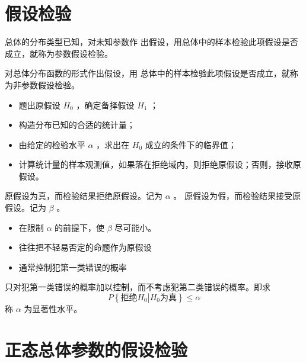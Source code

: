\section{假设检验}

 总体的分布类型已知，对未知参数作 出假设，用总体中的样本检验此项假设是否 成立，就称为参数假设检验。

 对总体分布函数的形式作出假设，用 总体中的样本检验此项假设是否成立，就称 为非参数假设检验。

\begin{itemize}[leftmargin=\paritemindent]
    \item 题出原假设 $ H_0 $ ，确定备择假设 $ H_1 $ ；
    \item 构造分布已知的合适的统计量；
    \item 由给定的检验水平 $ \alpha $ ，求出在 $ H_0 $ 成立的条件下的临界值；
    \item 计算统计量的样本观测值，如果落在拒绝域内，则拒绝原假设；否则，接收原假设。
\end{itemize}

 原假设为真，而检验结果拒绝原假设。记为 $ \alpha $ 。
 原假设为假，而检验结果接受原假设。记为 $ \beta $ 。
\begin{itemize}[leftmargin=\subparitemindent]
    \item 在限制 $ \alpha $ 的前提下，使 $ \beta $ 尽可能小。
    \item 往往把不轻易否定的命题作为原假设
    \item 通常控制犯第一类错误的概率
\end{itemize}

 只对犯第一类错误的概率加以控制，而不考虑犯第二类错误的概率。即求
$$ P\left\{ \mbox{拒绝}H_0 \left| H_0 \mbox{为真} \right. \right\} \leqslant \alpha $$
称 $ \alpha $ 为显著性水平。

\section{正态总体参数的假设检验}

